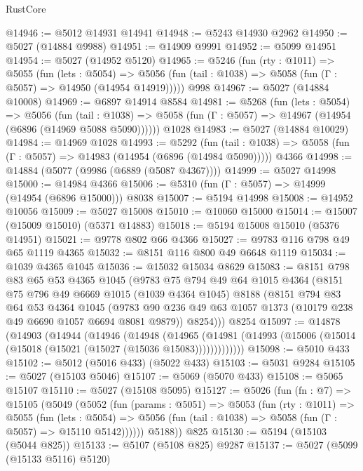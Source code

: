 \begin{lexlean}{RustCore}
\begin{coremodule}
@14946 := @5012 @14931 @14941
@14948 := @5243 @14930 @2962
@14950 := @5027 (@14884 @9988)
@14951 := @14909 @9991
@14952 := @5099 @14951
@14954 := @5027 (@14952 @5120)
@14965 := @5246
    (fun (rty : @1011) =>
    @5055
      (fun (lets : @5054) =>
      @5056 (fun (tail : @1038) => @5058 (fun (Γ : @5057) => @14950 (@14954 @14919)))))
    @998
@14967 := @5027 (@14884 @10008)
@14969 := @6897 @14914 @8584
@14981 := @5268
    (fun (lets : @5054) =>
    @5056
      (fun (tail : @1038) =>
      @5058 (fun (Γ : @5057) => @14967 (@14954 (@6896 (@14969 @5088 @5090))))))
    @1028
@14983 := @5027 (@14884 @10029)
@14984 := @14969 @1028
@14993 := @5292
    (fun (tail : @1038) => @5058 (fun (Γ : @5057) => @14983 (@14954 (@6896 (@14984 @5090)))))
    @4366
@14998 := @14884 (@5077 (@9986 (@6889 (@5087 @4367))))
@14999 := @5027 @14998
@15000 := @14984 @4366
@15006 := @5310 (fun (Γ : @5057) => @14999 (@14954 (@6896 @15000))) @8038
@15007 := @5194 @14998
@15008 := @14952 @10056
@15009 := @5027 @15008
@15010 := @10060 @15000
@15014 := @15007 (@15009 @15010) (@5371 @14883)
@15018 := @5194 @15008 @15010 (@5376 @14951)
@15021 := @9778 @802 @66 @4366
@15027 := @9783 @116 @798 @49 @65 @1119 @4365
@15032 := @8151 @116 @800 @49 @6648 @1119
@15034 := @1039 @4365 @1045
@15036 := @15032 @15034 @8629
@15083 := @8151
    @798
    @83
    @65
    @53
    @4365
    @1045
    (@9783
      @75
      @794
      @49
      @64
      @1015
      @4364
      (@8151
        @75
        @796
        @49
        @6669
        @1015
        (@1039 @4364 @1045)
        @8188
        (@8151
          @794
          @83
          @64
          @53
          @4364
          @1045
          (@9783 @90 @236 @49 @63 @1057 @1373 (@10179 @238 @49 @6690 @1057 @6694 @8081 @9879))
          @8254)))
    @8254
@15097 := @14878
    (@14903
      (@14944
        (@14946
          (@14948
            (@14965
              (@14981 (@14993 (@15006 (@15014 (@15018 (@15021 (@15027 (@15036 @15083)))))))))))))
@15098 := @5010 @433
@15102 := @5012 (@5016 @433) (@5022 @433)
@15103 := @5031 @9284
@15105 := @5027 (@15103 @5046)
@15107 := @5069 (@5070 @433)
@15108 := @5065 @15107
@15110 := @5027 (@15108 @5095)
@15127 := @5026
    (fun (fn : @7) =>
    @15105
      (@5049
        (@5052
          (fun (params : @5051) =>
          @5053
            (fun (rty : @1011) =>
            @5055
              (fun (lets : @5054) =>
              @5056 (fun (tail : @1038) => @5058 (fun (Γ : @5057) => @15110 @5142))))))
        @5188))
    @825
@15130 := @5194 (@15103 (@5044 @825))
@15133 := @5107 (@5108 @825) @9287
@15137 := @5027 (@5099 (@15133 @5116) @5120)

\end{coremodule}
\end{lexlean}
